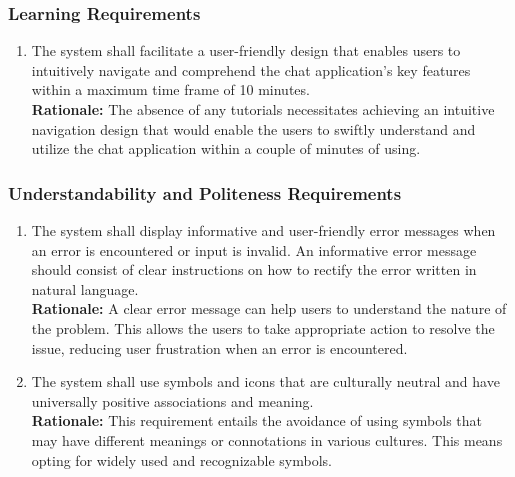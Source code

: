 \documentclass[]{article}
\begin{document}
\subsubsection{Learning Requirements}
\label{ssub:learning_requirements}
\begin{enumerate}[{UH-L}1. ]
	\item The system shall facilitate a user-friendly design that enables users to intuitively navigate and comprehend the chat application's key
	      features within a maximum time frame of 10 minutes.\\
	      {\bf Rationale:} The absence of any tutorials necessitates achieving an intuitive navigation design
	      that would enable the users to swiftly understand and utilize the chat application within a couple of minutes of using.
\end{enumerate}
\subsubsection{Understandability and Politeness Requirements}
\label{ssub:understandability_and_politeness_requirements}
\begin{enumerate}[{UH-UP}1. ]
	\item The system shall display informative and user-friendly error messages when an error is encountered or input is invalid.
	      An informative error message should consist of clear instructions on how to rectify the error written in natural language. \\
	      {\bf Rationale:} A clear error message can help users to understand the nature of the problem. This allows the users to
	      take appropriate action to resolve the issue, reducing user frustration when an error is encountered.
	\item The system shall use symbols and icons that are culturally neutral and have universally positive associations and meaning.\\
	      {\bf Rationale:} This requirement entails the avoidance of using symbols that may have different meanings or connotations
	      in various cultures. This means opting for widely used and recognizable symbols.
\end{enumerate}
\end{document}
